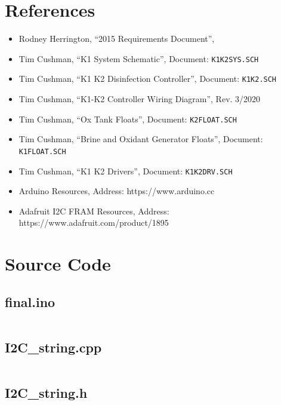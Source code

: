 \documentclass[12pt]{article}
\begin{document}
\section{References}
\begin{itemize}
    \item Rodney Herrington, “2015 Requirements Document”,
    \item Tim Cushman, “K1 System Schematic”, Document: \texttt{K1K2SYS.SCH}
    \item Tim Cushman, “K1 K2 Disinfection Controller”, Document: \texttt{K1K2.SCH}
    \item Tim Cushman, “K1-K2 Controller Wiring Diagram”, Rev. 3/2020
    \item Tim Cushman, “Ox Tank Floats”, Document: \texttt{K2FLOAT.SCH}
    \item Tim Cushman, “Brine and Oxidant Generator Floats”, Document: \texttt{K1FLOAT.SCH}
    \item Tim Cushman, “K1 K2 Drivers”, Document: \texttt{K1K2DRV.SCH}
    \item Arduino Resources, Address: https://www.arduino.cc
    \item Adafruit I2C FRAM Resources, Address: https://www.adafruit.com/product/1895
\end{itemize}

\newpage
\section{Source Code}
\subsection{final.ino}
\inputminted[frame=lines, linenos, fontsize=\footnotesize]{cpp}{code/final.ino}\newpage
\subsection{I2C\_string.cpp}
\inputminted[frame=lines, linenos, fontsize=\footnotesize]{cpp}{code/I2C_string.cpp}\newpage
\subsection{I2C\_string.h}
\inputminted[frame=lines, linenos, fontsize=\footnotesize]{cpp}{code/I2C_string.h}
\end{document}
